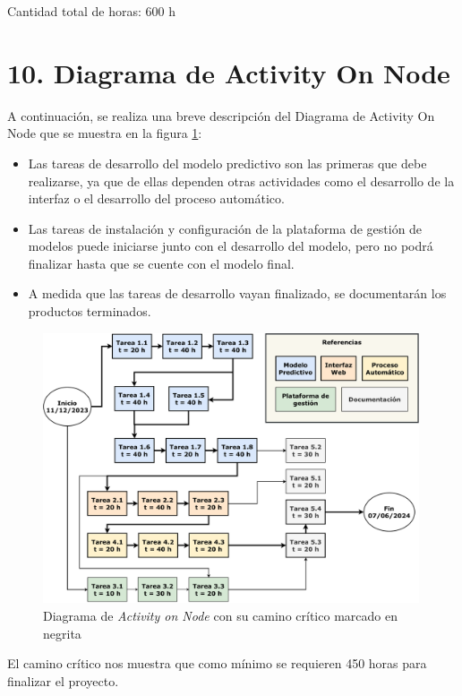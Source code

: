 \documentclass[
11pt, %
]{charter}
\begin{document}
Cantidad total de horas: 600 h

\section{10. Diagrama de Activity On Node}
\label{sec:AoN}

A continuación, se realiza una breve descripción del Diagrama de Activity On Node que se muestra en la figura \ref{fig:AoN}:

\begin{itemize}
	\item Las tareas de desarrollo del modelo predictivo son las primeras que debe realizarse, ya que de ellas dependen otras actividades como el desarrollo de la interfaz o el desarrollo del proceso automático. 
	\item Las tareas de instalación y configuración de la plataforma de gestión de modelos puede iniciarse junto con el desarrollo del modelo, pero no podrá finalizar hasta que se cuente con el modelo final.
	\item A medida que las tareas de desarrollo vayan finalizado, se documentarán los productos terminados.
\end{itemize}

\begin{figure}[htpb]
\centering 
\includegraphics[width=0.99\textwidth]{./Figuras/AoN_Extendido.pdf}
\caption{Diagrama de \textit{Activity on Node} con su camino crítico marcado en negrita}
\label{fig:AoN}
\end{figure}

El camino crítico nos muestra que como mínimo se requieren 450 horas para finalizar el proyecto.
\end{document}
